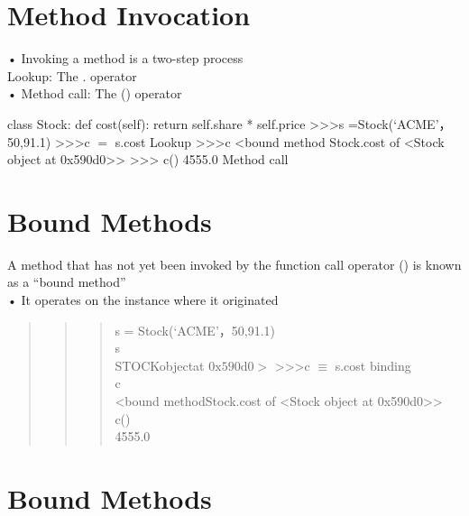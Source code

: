 \documentclass[
  letterpaper,
  DIV=11,
  numbers=noendperiod]{scrreprt}
\begin{document}
\chapter{Method Invocation}\label{method-invocation}

• Invoking a method is a two-step process\\
Lookup: The . operator\\
• Method call: The () operator

class Stock: def cost(self): return self.share * self.price
\textgreater\textgreater\textgreater s =Stock(`ACME'，50,91.1)
\textgreater\textgreater\textgreater c \(=\) s.cost Lookup
\textgreater\textgreater\textgreater c \textless bound method Stock.cost
of \textless Stock object at 0x590d0\textgreater\textgreater{}
\textgreater\textgreater\textgreater{} c() 4555.0 Method call


\chapter{Bound Methods}\label{bound-methods}

A method that has not yet been invoked by the function call operator ()
is known as a ``bound method''\\
• It operates on the instance where it originated

\begin{quote}
\begin{quote}
\begin{quote}
s = Stock(`ACME'，50,91.1)\\
s\\
STOCKobjectat \(0\mathrm{x}590\mathrm{d}0>\)
\textgreater\textgreater\textgreater c \(\equiv\) s.cost binding\\
c\\
\textless bound methodStock.cost of \textless Stock object at
0x590d0\textgreater\textgreater{}\\
c()\\
4555.0
\end{quote}
\end{quote}
\end{quote}


\chapter{Bound Methods}\label{bound-methods-1}
\end{document}
